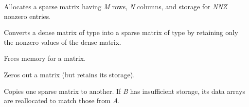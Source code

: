 \documentclass[letterpaper,10pt,english]{sphinxmanual}
\begin{document}
\begin{fulllineitems}
\label{linear_solvers/SLS:NewSparseMat}
Allocates a {\hyperref[linear_solvers/SLS:SlsMat]{}} sparse matrix having \emph{M} rows, \emph{N}
columns, and storage for \emph{NNZ} nonzero entries.

\end{fulllineitems}


\begin{fulllineitems}
\label{linear_solvers/SLS:SlsConvertDls}
Converts a dense matrix of type {\hyperref[linear_solvers/DLS:DlsMat]{}} into a sparse
matrix of type {\hyperref[linear_solvers/SLS:SlsMat]{}} by retaining only the nonzero
values of the dense matrix.

\end{fulllineitems}


\begin{fulllineitems}
\label{linear_solvers/SLS:DestroySparseMat}
Frees memory for a {\hyperref[linear_solvers/SLS:SlsMat]{}} matrix.

\end{fulllineitems}


\begin{fulllineitems}
\label{linear_solvers/SLS:SlsSetToZero}
Zeros out a {\hyperref[linear_solvers/SLS:SlsMat]{}} matrix (but retains its storage).

\end{fulllineitems}


\begin{fulllineitems}
\label{linear_solvers/SLS:CopySparseMat}
Copies one sparse matrix to another.  If \emph{B} has insufficient
storage, its data arrays are reallocated to match those from \emph{A}.

\end{fulllineitems}
\end{document}
